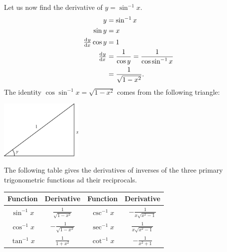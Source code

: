 Let us now find the derivative of $ y = \sin^{-1} x $.
\begin{align*}
  y &= \sin^{-1} x\\
  \sin y &= x\\
  \od{y}{x} \cos y &= 1\\
  \od{y}{x} &= \frac{1}{\cos y} = \frac{1}{\cos \sin^{-1} x}\\
            &= \frac{1}{\sqrt{1 - x^2}}.
\end{align*}
The identity $ \cos\sin^{-1} x = \sqrt{1 - x^2} $ comes from the following triangle:
\begin{center}
  \includegraphics[width=0.3\textwidth]{antitriangle}
\end{center}

\begin{thm}
  The following table gives the derivatives of inverses of the three primary trigonometric functions ad
  their reciprocals.
  \begin{center}
  \begin{tabular}{|c|c|c|c|}\hline
    \textbf{Function} & \textbf{Derivative} &
    \textbf{Function} & \textbf{Derivative}\\\hline
    $ \sin^{-1} x $ & $ \frac{1}{\sqrt{1 - x^2}} $ &
    $ \csc^{-1} x $ & $ -\frac{1}{x\sqrt{x^2 - 1}} $ \\\hline
    $ \cos^{-1} x $ & $ -\frac{1}{\sqrt{1 - x^2}} $ &
    $ \sec^{-1} x $ & $ \frac{1}{x\sqrt{x^2 - 1}} $\\\hline
    $ \tan^{-1} x $ & $ \frac{1}{1+x^2} $ &
    $ \cot^{-1} x $ & $ -\frac{1}{x^2 + 1}$\\\hline
  \end{tabular}
  \end{center}
\end{thm}


\clearpage
